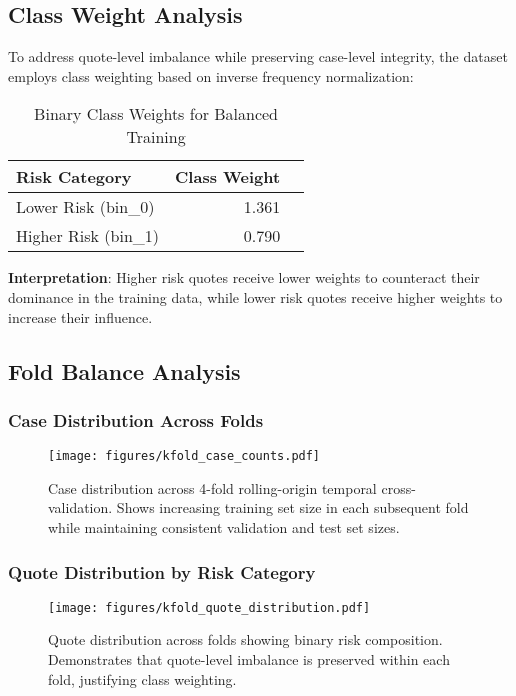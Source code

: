 \documentclass[11pt,a4paper]{article}
\begin{document}
\subsection{Class Weight Analysis}

To address quote-level imbalance while preserving case-level integrity, the dataset employs class weighting based on inverse frequency normalization:


\begin{table}[H]
\centering
\caption{Binary Class Weights for Balanced Training}
\begin{tabular}{lrr}
\toprule
\textbf{Risk Category} & \textbf{Class Weight} \\
\midrule
Lower Risk (bin\_0) & 1.361 \\
Higher Risk (bin\_1) & 0.790 \\

\bottomrule
\end{tabular}
\end{table}

\textbf{Interpretation}: Higher risk quotes receive lower weights to counteract their dominance in the training data, while lower risk quotes receive higher weights to increase their influence.


\subsection{Fold Balance Analysis}

\subsubsection{Case Distribution Across Folds}

\begin{figure}[H]
\centering
\texttt{[image: figures/kfold\_case\_counts.pdf]}
\caption{Case distribution across 4-fold rolling-origin temporal cross-validation. Shows increasing training set size in each subsequent fold while maintaining consistent validation and test set sizes.}
\end{figure}

\subsubsection{Quote Distribution by Risk Category}

\begin{figure}[H]
\centering
\texttt{[image: figures/kfold\_quote\_distribution.pdf]}
\caption{Quote distribution across folds showing binary risk composition. Demonstrates that quote-level imbalance is preserved within each fold, justifying class weighting.}
\end{figure}
\end{document}
